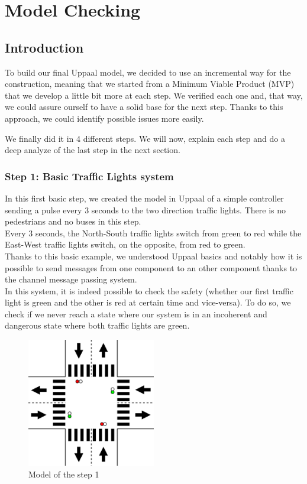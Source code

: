\section{Model Checking}
\subsection{Introduction}
To build our final Uppaal model, we decided to use an incremental way for the construction, meaning that we started from a Minimum Viable Product (MVP) that we develop a little bit more at each step. We verified each one and, that way, we could assure ourself to have a solid base for the next step. Thanks to this approach, we could identify possible issues more easily.

We finally did it in 4 different steps. We will now, explain each step and do a deep analyze of the last step in the next section.

\subsubsection{Step 1: Basic Traffic Lights system}
In this first basic step, we created the model in Uppaal of a simple controller sending a pulse every 3 seconds to the two direction traffic lights. There is no pedestrians and no buses in this step. \\
Every 3 seconds, the North-South traffic lights switch from green to red while the East-West traffic lights switch, on the opposite, from red to green. \\

Thanks to this basic example, we understood Uppaal basics and notably how it is possible to send messages from one component to an other component thanks to the channel message passing system. \\

In this system, it is indeed possible to check the safety (whether our first traffic light is green and the other is red at certain time and vice-versa). To do so, we check if we never reach a state where our system is in an incoherent and dangerous state where both traffic lights are green.


\begin{figure}[H]\label{fig:step1}
  \centering
    \includegraphics[width=0.5\textwidth]{picture/model/trafficlight_step1_s1.png}
    \caption{Model of the step 1}
\end{figure}


